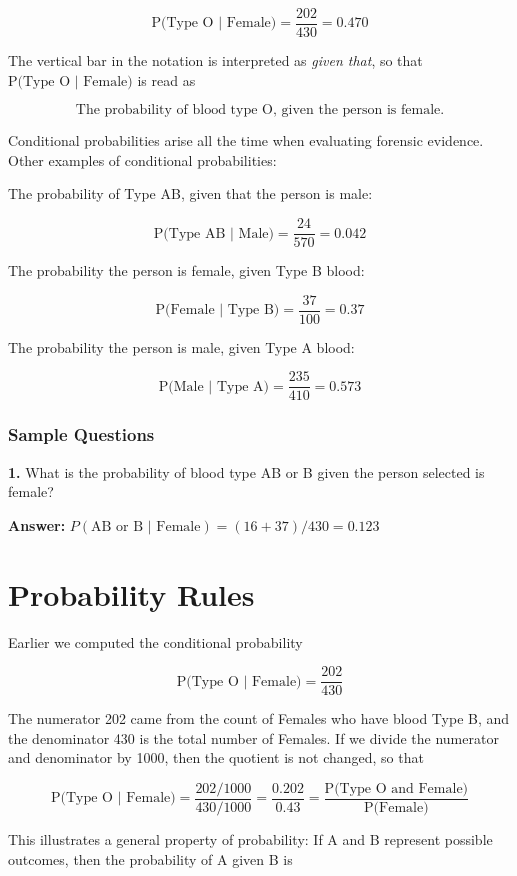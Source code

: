 \documentclass[
]{book}
\begin{document}
\[
\mbox{P(Type O | Female)} = \frac{202}{430} = 0.470
\]

The vertical bar in the notation is interpreted as \emph{given that}, so that \(\mbox{P(Type O | Female)}\) is read as

\[
\mbox{The probability of blood type O, given the person is female.}
\]

Conditional probabilities arise all the time when evaluating forensic evidence. Other examples of conditional probabilities:

The probability of Type AB, given that the person is male:

\[
\mbox{P(Type AB | Male)} = \frac{24}{570} = 0.042
\]

The probability the person is female, given Type B blood:

\[
\mbox{P(Female | Type B)} = \frac{37}{100} = 0.37
\]

The probability the person is male, given Type A blood:

\[
\mbox{P(Male | Type A)} = \frac{235}{410} = 0.573
\]

\hypertarget{sample-questions-4}{%
\subsection{Sample Questions}\label{sample-questions-4}}

\textbf{1.} What is the probability of blood type AB or B given the person selected is female?

\textbf{Answer:} \(P(\text{AB or B | Female}) = (16 + 37) / 430 = 0.123\)

\hypertarget{probability-rules}{%
\chapter{Probability Rules}\label{probability-rules}}

Earlier we computed the conditional probability

\[
\mbox{P(Type O | Female)} = \frac{202}{430} 
\]

The numerator 202 came from the count of Females who have blood Type B, and the denominator 430 is the total number of Females.
If we divide the numerator and denominator by 1000, then the quotient is not changed, so that

\[
\mbox{P(Type O | Female)} = \frac{202/1000}{430/1000} 
= \frac{0.202}{0.43} = \frac{\mbox{P(Type O and Female)}}{\mbox{P(Female)}}
\]

This illustrates a general property of probability: If A and B represent possible outcomes, then the probability of A given B is
\end{document}
